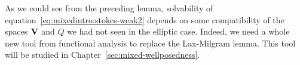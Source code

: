 \begin{remark}
  As we could see from the preceding lemma, solvability of
  equation~\eqref{eq:mixedintro:stokes-weak2} depends on some
  compatibility of the spaces $\mathbf V$ and $Q$ we had not seen in the
  elliptic case. Indeed, we need a whole new tool from functional
  analysis to replace the Lax-Milgram lemma. This tool will be studied
  in Chapter~\ref{sec:mixed-wellposedness}.
\end{remark}

